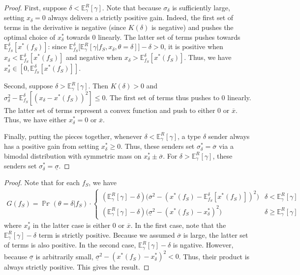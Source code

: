 \documentclass[11pt,dvipsnames]{article}
\newcommand{\xlow}{0}
\begin{document}
\begin{appendix}
\begin{proof}
First, suppose $\delta < \mathbb{E}_\gamma^R[\gamma]$. 
Note that because $\sigma_\delta$ is sufficiently large, setting $x_\delta = 0$ always delivers a strictly positive gain.
Indeed, the first set of terms in the derivative is negative (since $K(\delta)$ is negative) and pushes the optimal choice of $x_\delta^*$ towards $0$ linearly.
The latter set of terms pushes towards $\mathbb{E}_{f_S}^\delta[x^*(f_S)]$: since $\mathbb{E}_{f_S}^\delta\big[\mathbb{E}_\gamma^R[\gamma|f_S,x_\delta,\theta=\delta]\big]-\delta>0$, it is positive when $x_\delta<\mathbb{E}_{f_S}^\delta[x^*(f_S)]$ and negative when $x_\delta>\mathbb{E}_{f_S}^\delta[x^*(f_S)]$.
Thus, we have $x_\delta^* \in [0, \mathbb{E}_{f_S}^\delta[x^*(f_S)]]$.

Second, suppose $\delta > \mathbb{E}_\gamma^R[\gamma]$. Then $K(\delta)>0$ and $\sigma_\delta^2-\mathbb{E}_{f_S}^\delta[(x_\delta-x^*(f_S))^2] \leq 0$.
The first set of terms thus pushes to $0$ linearly.
The latter set of terms represent a convex function and push to either $0$ or $\overline{x}$.
Thus, we have either $x_\delta^* = 0$ or $\overline{x}$.

Finally, putting the pieces together, whenever $\delta < \mathbb{E}_\gamma^R[\gamma]$, a type $\delta$ sender always has a positive gain from setting $x_\delta^*\geq 0$.
Thus, these senders set $\sigma_\delta^*=\overline{\sigma}$ via a bimodal distribution with symmetric mass on $x_\delta^* \pm \overline{\sigma}$.
For $\delta > \mathbb{E}_\gamma^R[\gamma]$, these senders set $\sigma_\delta^* = \underline{\sigma}$. 


\end{proof}

\simplegain*
\begin{proof}
Note that for each $f_S$, we have
\begin{align*}
G(f_S) = \mathbb\Pr(\theta=\delta|f_S) \cdot 
\begin{cases}
(\mathbb{E}_\gamma^R[\gamma]-\delta)\big(\overline{\sigma}^2-(x^*(f_S)-\mathbb{E}_{f_S}^\delta[x^*(f_S)])^2\big) & \delta < \mathbb{E}_\gamma^R[\gamma] 
\\
(\mathbb{E}_\gamma^R[\gamma]-\delta)\big(\underline{\sigma}^2-(x^*(f_S)-x_\delta^*)^2\big) & \delta \geq \mathbb{E}_\gamma^R[\gamma]
\end{cases}
\end{align*}
where $x_\delta^*$ in the latter case is either $\xlow$ or $\overline{x}$.
In the first case, note that the $\mathbb{E}_\gamma^R[\gamma]-\delta$ term is strictly positive.
Because we assumed $\overline{\sigma}$ is large, the latter set of terms is also positive.
In the second case, $\mathbb{E}_\gamma^R[\gamma]-\delta$ is ngative.
However, because $\underline{\sigma}$ is arbitrarily small, $\underline{\sigma}^2-(x^*(f_S)-x_\delta^*)^2 < 0$.
Thus, their product is always strictly positive.
This gives the result.
\end{proof}


\end{appendix}
\end{document}
